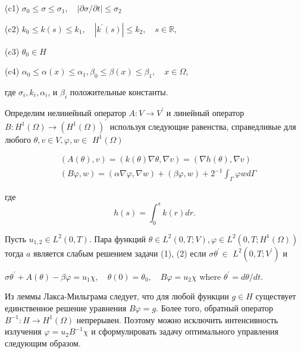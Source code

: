 (c1) $\sigma_{0} \leq \sigma \leq \sigma_{1}, \quad|\partial \sigma / \partial t| \leq \sigma_{2}$

(c2) $k_{0} \leq k(s) \leq k_{1}, \quad\left|k^{\prime}(s)\right| \leq k_{2}, \quad s \in \mathbb{R}$,

(c3) $\theta_{0} \in H$

(c4) $\alpha_{0} \leq \alpha(x) \leq \alpha_{1}, \beta_{0} \leq \beta(x) \leq \beta_{1}, \quad x \in \Omega$,

где $\sigma_{i}, k_{i}, \alpha_{i}$, и $\beta_{i}$ положительные константы.

Определим нелинейный оператор $A: V \rightarrow V^{\prime}$ и линейный оператор
$B: H^{1}(\Omega) \rightarrow\left(H^{1}(\Omega)\right)^{\prime}$
используя следующие равенства, справедливые для любого
$\theta, v \in V, \varphi, w \in$ $H^{1}(\Omega)$

\[
    \begin{aligned}
        &(A(\theta), v)=(k(\theta) \nabla \theta, \nabla v)=(\nabla h(\theta), \nabla v) \\
        &(B \varphi, w)=(\alpha \nabla \varphi, \nabla w)+(\beta \varphi, w)+2^{-1}
        \int_{\Gamma} \varphi w d \Gamma
    \end{aligned}
\]

где
\[
    h(s)=\int_{0}^{s} k(r) d r.
\]

\begin{definition}
    Пусть $u_{1,2} \in L^{2}(0, T)$.
    Пара функций $\theta \in L^{2}(0, T ; V), \varphi \in L^{2}\left(0, T ; H^{1}(\Omega)\right)$
    тогда $a$ является слабым решением задачи (1), (2)
    если $\sigma \theta^{\prime} \in$ $L^{2}\left(0, T ; V^{\prime}\right)$ и

    $\sigma \theta^{\prime}+A(\theta)-\beta \varphi=u_{1} \chi, \quad \theta(0)=\theta_{0},
    \quad B \varphi=u_{2} \chi$ where $\theta^{\prime}=d \theta / d t$.
\end{definition}

Из леммы Лакса-Мильграма следует, что для любой функции $g \in H$
существует единственное решение уравнения $B \varphi=g$.
Более того, обратный оператор $B^{-1}: H \rightarrow H^{1}(\Omega)$ непрерывен.
Поэтому можно исключить интенсивность излучения $\varphi=u_{2} B^{-1} \chi$ и
сформулировать задачу оптимального управления следующим образом.

